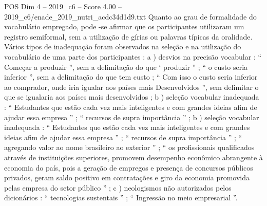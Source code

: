 \begin{textsample}{POS Dim 4 – 2019\_c6 – Score 4.00 – 2019\_c6/enade\_2019\_nutri\_acdc34d1d9.txt}
Quanto ao grau de formalidade do vocabulário empregado, pode -se afirmar que os participantes utilizaram um registro semiformal, sem a utilização de gírias ou palavras típicas da oralidade.
Vários tipos de inadequação foram observados na seleção e na utilização do vocabulário de uma parte dos participantes : a ) desvios na precisão vocabular : “ Começar a produzir ”, sem a delimitação do que ‘ produzir ” ; “ o custo seria inferior ”, sem a delimitação do que tem custo ; “ Com isso o custo seria inferior ao comprador, onde iria igualar aos países mais Desenvolvidos ”, sem delimitar o que se igualaria aos países mais desenvolvidos ; b ) seleção vocabular inadequada : “ Estudantes que estão cada vez mais inteligentes e com grandes ideias afim de ajudar essa empresa ” ; “ recursos de supra importância ” ; b ) seleção vocabular inadequada : “ Estudantes que estão cada vez mais inteligentes e com grandes ideias afim de ajudar essa empresa ” ; “ recursos de supra importância ” ; “ agregando valor ao nome brasileiro ao exterior ” ; “ os profissionais qualificados através de instituições superiores, promovem desempenho econômico abrangente à economia do país, pois a geração de empregos e presença de concursos públicos privados, geram saldo positivo em contratações e giro da economia promovida pelas empresa do setor público ” ; c ) neologismos não autorizados pelos dicionários : “ tecnologias sustentais ” ; “ Ingressão no meio empresarial ”.

\end{textsample}
